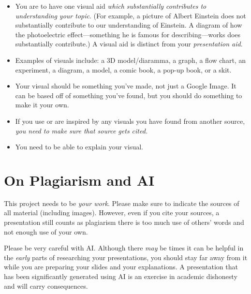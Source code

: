 \documentclass[10pt]{exam}
\begin{document}
\begin{itemize}
  \item 
    You are to have one visual aid \emph{which substantially contributes to understanding your topic}. (For example, a picture of Albert Einstein does not substantially contribute to our understanding of Einstein.  A diagram of how the photoelectric effect---something he is famous for describing---works does substantially contribute.)  A visual aid is distinct from your \emph{presentation aid}.
  
  \item 
    Examples of visuals include: a 3D model/diaramma, a graph, a flow chart, an experiment, a	diagram, a model, a comic book, a pop-up book, or a skit.

  \item
    Your visual should be something you've made, not just a Google Image.  It can be based off of something you've found, but you should do something to make it your own.

  \item  
    If you use or are inspired by any visuals you have found from another source, \emph{you need to make sure that source gets cited.}

  \item
    You need to be able to explain your visual.
  
\end{itemize}

\section*{On Plagiarism and AI}
This project needs to be \emph{your work}.  Please make sure to indicate the sources of all material (including images). However, even if you cite your sources, a presentation still counts as plagiarism there is too much use of others' words and not enough use of your own. 

Please be very careful with AI.  Although there \emph{may} be times it can be helpful in the \emph{early} parts of researching your presentations, you should stay far away from it while you are preparing your slides and your explanations.  A presentation that has been significantly generated using AI is an exercise in academic dishonesty and will carry consequences.


\end{document}
